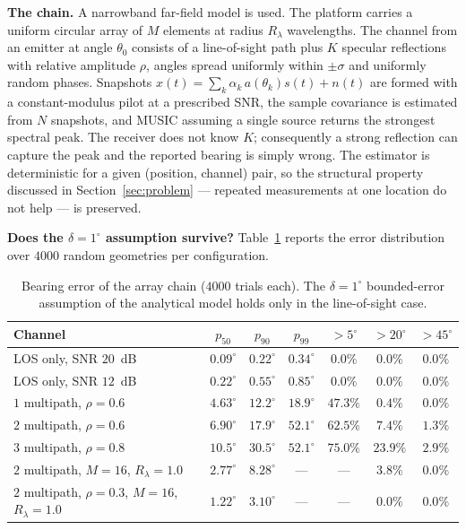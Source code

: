 \documentclass[preprint,12pt,3p]{elsarticle}
\theoremstyle{definition}
\begin{document}
\noindent\textbf{The chain.} A narrowband far-field model is used. The platform carries a
uniform circular array of $M$ elements at radius $R_\lambda$ wavelengths. The channel from an
emitter at angle $\theta_0$ consists of a line-of-sight path plus $K$ specular reflections with
relative amplitude $\rho$, angles spread uniformly within $\pm\sigma$ and uniformly random phases.
Snapshots $x(t)=\sum_k\alpha_k\,a(\theta_k)s(t)+n(t)$ are formed with a constant-modulus pilot at
a prescribed SNR, the sample covariance is estimated from $N$ snapshots, and MUSIC assuming a
single source returns the strongest spectral peak. The receiver does not know $K$; consequently a
strong reflection can capture the peak and the reported bearing is simply wrong. The estimator is
deterministic for a given (position, channel) pair, so the structural property discussed in
Section~\ref{sec:problem} --- repeated measurements at one location do not help --- is preserved.

\noindent\textbf{Does the $\delta=1^\circ$ assumption survive?} Table~\ref{tab:rf} reports the error
distribution over $4000$ random geometries per configuration.

\begin{table}[t]
\caption{Bearing error of the array chain ($4000$ trials each). The $\delta=1^\circ$ bounded-error
assumption of the analytical model holds only in the line-of-sight case.}
\label{tab:rf}
\centering
\small
\begin{tabular}{lcccccc}
\toprule
Channel & $p_{50}$ & $p_{90}$ & $p_{99}$ & $>5^\circ$ & $>20^\circ$ & $>45^\circ$ \\
\midrule
LOS only, SNR $20$~dB                & $0.09^\circ$ & $0.22^\circ$ & $0.34^\circ$ & $0.0\%$ & $0.0\%$ & $0.0\%$ \\
LOS only, SNR $12$~dB                & $0.22^\circ$ & $0.55^\circ$ & $0.85^\circ$ & $0.0\%$ & $0.0\%$ & $0.0\%$ \\
$1$ multipath, $\rho=0.6$            & $4.63^\circ$ & $12.2^\circ$ & $18.9^\circ$ & $47.3\%$ & $0.4\%$ & $0.0\%$ \\
$2$ multipath, $\rho=0.6$            & $6.90^\circ$ & $17.9^\circ$ & $52.1^\circ$ & $62.5\%$ & $7.4\%$ & $1.3\%$ \\
$3$ multipath, $\rho=0.8$            & $10.5^\circ$ & $30.5^\circ$ & $52.1^\circ$ & $75.0\%$ & $23.9\%$ & $2.9\%$ \\
\midrule
$2$ multipath, $M{=}16$, $R_\lambda{=}1.0$ & $2.77^\circ$ & $8.28^\circ$ & --- & --- & $3.8\%$ & $0.0\%$ \\
$2$ multipath, $\rho{=}0.3$, $M{=}16$, $R_\lambda{=}1.0$ & $1.22^\circ$ & $3.10^\circ$ & --- & --- & $0.0\%$ & $0.0\%$ \\
\bottomrule
\end{tabular}
\end{table}
\end{document}
